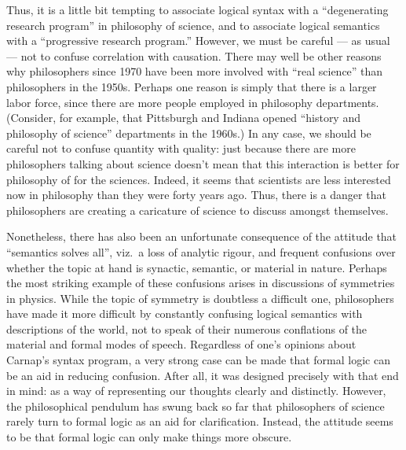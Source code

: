 Thus, it is a little bit tempting to associate logical syntax with a
``degenerating research program'' in philosophy of science, and to
associate logical semantics with a ``progressive research program.''
However, we must be careful --- as usual --- not to confuse
correlation with causation.  There may well be other reasons why
philosophers since 1970 have been more involved with ``real science''
than philosophers in the 1950s.  Perhaps one reason is simply that
there is a larger labor force, since there are more people employed in
philosophy departments.  (Consider, for example, that Pittsburgh and
Indiana opened ``history and philosophy of science'' departments in
the 1960s.)  In any case, we should be careful not to confuse quantity
with quality: just because there are more philosophers talking about
science doesn't mean that this interaction is better for philosophy of
for the sciences.  Indeed, it seems that scientists are less
interested now in philosophy than they were forty years ago.  Thus,
there is a danger that philosophers are creating a caricature of
science to discuss amongst themselves.

Nonetheless, there has also been an unfortunate consequence of the
attitude that ``semantics solves all'', viz.\ a loss of analytic
rigour, and frequent confusions over whether the topic at hand is
synactic, semantic, or material in nature.  Perhaps the most striking
example of these confusions arises in discussions of symmetries in
physics.  While the topic of symmetry is doubtless a difficult one,
philosophers have made it more difficult by constantly confusing
logical semantics with descriptions of the world, not to speak of
their numerous conflations of the material and formal modes of speech.
Regardless of one's opinions about Carnap's syntax program, a very
strong case can be made that formal logic can be an aid in reducing
confusion.  After all, it was designed precisely with that end in
mind: as a way of representing our thoughts clearly and distinctly.
However, the philosophical pendulum has swung back so far that
philosophers of science rarely turn to formal logic as an aid for
clarification.  Instead, the attitude seems to be that formal logic
can only make things more obscure.

